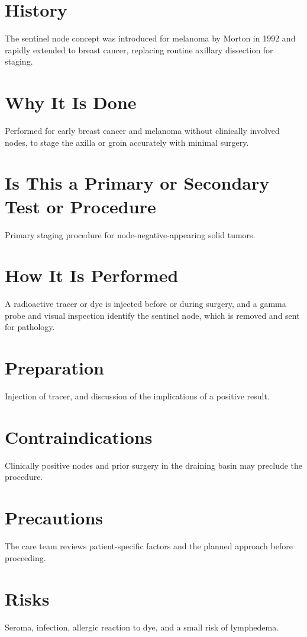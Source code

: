 \section*{History}
The sentinel node concept was introduced for melanoma by Morton in 1992 and rapidly extended to breast cancer, replacing routine axillary dissection for staging.

\section*{Why It Is Done}
Performed for early breast cancer and melanoma without clinically involved nodes, to stage the axilla or groin accurately with minimal surgery.

\section*{Is This a Primary or Secondary Test or Procedure}
Primary staging procedure for node-negative-appearing solid tumors.

\section*{How It Is Performed}
A radioactive tracer or dye is injected before or during surgery, and a gamma probe and visual inspection identify the sentinel node, which is removed and sent for pathology.

\section*{Preparation}
Injection of tracer, and discussion of the implications of a positive result.

\section*{Contraindications}
Clinically positive nodes and prior surgery in the draining basin may preclude the procedure.

\section*{Precautions}
The care team reviews patient-specific factors and the planned approach before proceeding.

\section*{Risks}
Seroma, infection, allergic reaction to dye, and a small risk of lymphedema.

